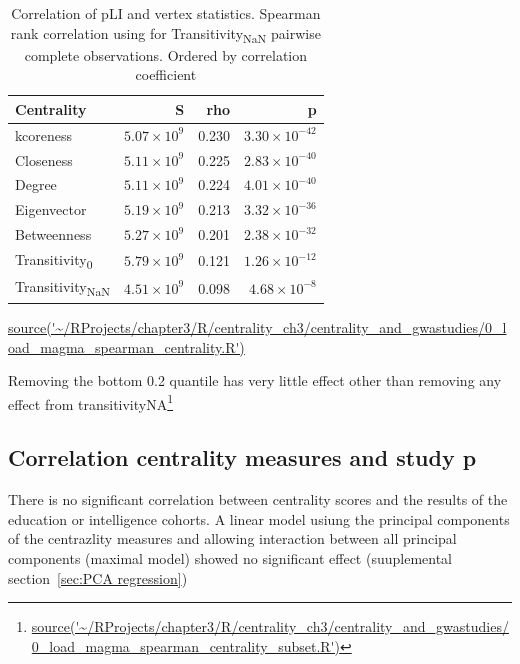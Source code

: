 \begin{table}[ht]
\centering
\setlength{\extrarowheight}{2pt}
\begin{tabular}{lrrr}
  \toprule
Centrality & S & rho & p \\ 
  \midrule
kcoreness & $5.07 \times 10^{9}$ & 0.230 & $3.30 \times 10^{-42}$ \\ 
  Closeness & $5.11 \times 10^{9}$ & 0.225 & $2.83 \times 10^{-40}$ \\ 
  Degree & $5.11 \times 10^{9}$ & 0.224 & $4.01 \times 10^{-40}$ \\ 
  Eigenvector & $5.19 \times 10^{9}$ & 0.213 & $3.32 \times 10^{-36}$ \\ 
  Betweenness & $5.27 \times 10^{9}$ & 0.201 & $2.38 \times 10^{-32}$ \\ 
  Transitivity\textsubscript{0} & $5.79 \times 10^{9}$ & 0.121 & $1.26 \times 10^{-12}$ \\ 
  Transitivity\textsubscript{NaN} & $4.51 \times 10^{9}$ & 0.098 & $4.68 \times 10^{-8}$ \\ 
   \bottomrule
\end{tabular}
\caption{Correlation of pLI and vertex statistics. Spearman rank correlation using for Transitivity\textsubscript{NaN} pairwise complete observations.  Ordered by correlation coefficient}
\tiny\url{source('~/RProjects/chapter3/R/centrality_ch3/centrality_and_gwastudies/0_load_magma_spearman_centrality.R')}
\label{tab:correlation pli vertex statistics mar}
\end{table}

Removing the bottom 0.2 quantile has very little effect other than removing any effect from transitivityNA\footnote{\url{source('~/RProjects/chapter3/R/centrality_ch3/centrality_and_gwastudies/0_load_magma_spearman_centrality_subset.R')}}


\subsection{Correlation centrality measures and study p}

There is no significant correlation between centrality scores and the results of the education or intelligence cohorts. A linear model usiung the principal components of the centrazlity measures and allowing interaction between all principal components (maximal model) showed no significant effect (suuplemental section~\ref{sec:PCA regression})


